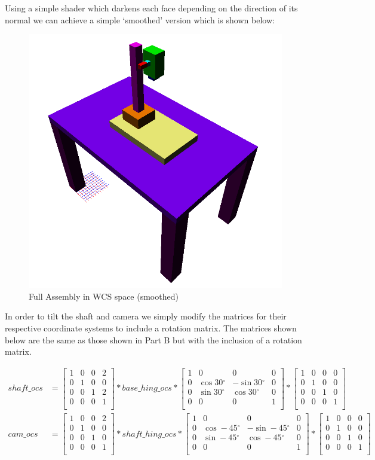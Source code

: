 \documentclass[12pt]{article}
\newcommand{\degree}{\ensuremath{^\circ}}
\newcommand{\rotx}[1]{
    \begin{bmatrix}
        1 & 0      & 0       & 0 \\
        0 & \cos#1\degree & -\sin#1\degree & 0 \\
        0 & \sin#1\degree & \cos#1\degree  & 0 \\
        0 & 0      & 0       & 1 \\
    \end{bmatrix}
}
\newcommand{\identity}{
    \begin{bmatrix}
        1 & 0 & 0 & 0 \\
        0 & 1 & 0 & 0 \\
        0 & 0 & 1 & 0 \\
        0 & 0 & 0 & 1 \\
    \end{bmatrix}
}
\newcommand{\trans}[3]{
    \begin{bmatrix}
        1 & 0 & 0 & #1 \\
        0 & 1 & 0 & #2 \\
        0 & 0 & 1 & #3 \\
        0 & 0 & 0 & 1 \\
    \end{bmatrix}
}
\begin{document}
        \newpage
        Using a simple shader which darkens each face depending on the
        direction of its normal we can achieve a simple `smoothed' version
        which is shown below:

        \begin{figure}[H]
            \centering
            \includegraphics[width=\linewidth]{../images/assembly_smooth.png}
            \caption{Full Assembly in WCS space (smoothed)}
        \end{figure}

        \newpage
        In order to tilt the shaft and camera we simply modify the matrices for
        their respective coordinate systems to include a rotation matrix. The
        matrices shown below are the same as those shown in Part B but with the
        inclusion of a rotation matrix.

        $$
        \begin{aligned}
            shaft\_ocs &= \trans{2}{0}{2} * base\_hing\_ocs * \rotx{30} * \identity \\
            cam\_ocs   &= \trans{2}{0}{0} * shaft\_hing\_ocs * \rotx{-45} * \identity \\
        \end{aligned}
        $$
\end{document}
